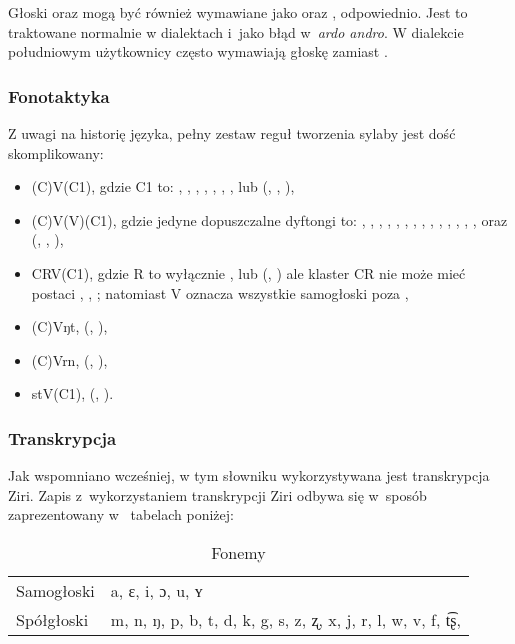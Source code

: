 \begin{spacing}{1.1}
Głoski  oraz  mogą być również wymawiane jako  oraz ,
odpowiednio. Jest to traktowane normalnie w dialektach i~jako błąd w~\emph{ardo
andro}. W dialekcie południowym użytkownicy często wymawiają głoskę 
zamiast .

\subsubsection{Fonotaktyka}

Z uwagi na historię języka, pełny zestaw reguł tworzenia sylaby jest dość
skomplikowany:

\begin{itemize}
	\item (C)V(C1), gdzie C1 to: , , , , , , ,  lub  (, , ),
	\item (C)V(V)(C1), gdzie jedyne dopuszczalne dyftongi to: , , , , , , , , , , , , , ,  oraz  (, , ),
	\item CRV(C1), gdzie R to wyłącznie ,  lub  (, ) ale klaster CR nie może mieć postaci , , ; natomiast V oznacza wszystkie samogłoski poza ,
	\item (C)Vŋt, (, ),
	\item (C)Vrn, (, ),
	\item stV(C1), (, ).
\end{itemize}

\subsubsection{Transkrypcja}

Jak wspomniano wcześniej, w tym słowniku wykorzystywana jest transkrypcja Ziri. 
Zapis z~wykorzystaniem transkrypcji Ziri odbywa się w~sposób zaprezentowany w~
tabelach poniżej:

\begin{table}[ht]
	\centering
	\caption{Fonemy}
	\begin{tabular}{ll} \toprule
		Samogłoski & a, ɛ, i, ɔ, u, ʏ \\
		Spółgłoski & m, n, ŋ, p, b, t, d, k, g, s, z, ʐ, x, j, r, l, w, v, f, t͡ʂ, \\\bottomrule
	\end{tabular}
	\label{tab:phonemes}
\end{table}


\end{spacing}

